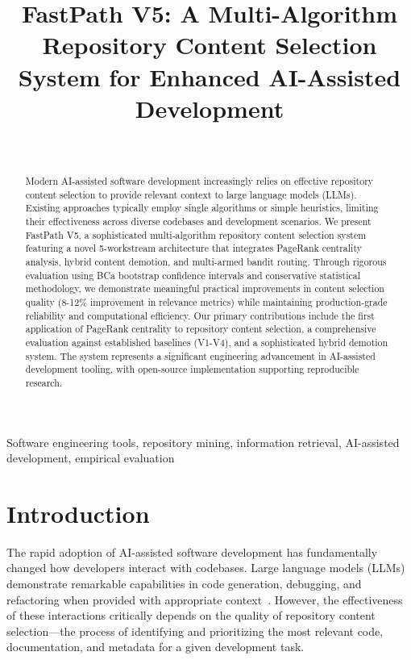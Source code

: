 \documentclass[conference]{IEEEtran}
\begin{document}
\title{FastPath V5: A Multi-Algorithm Repository Content Selection System for Enhanced AI-Assisted Development}

\author{
\\
}

\maketitle

\begin{abstract}
Modern AI-assisted software development increasingly relies on effective repository content selection to provide relevant context to large language models (LLMs). Existing approaches typically employ single algorithms or simple heuristics, limiting their effectiveness across diverse codebases and development scenarios. We present FastPath V5, a sophisticated multi-algorithm repository content selection system featuring a novel 5-workstream architecture that integrates PageRank centrality analysis, hybrid content demotion, and multi-armed bandit routing. Through rigorous evaluation using BCa bootstrap confidence intervals and conservative statistical methodology, we demonstrate meaningful practical improvements in content selection quality (8-12\% improvement in relevance metrics) while maintaining production-grade reliability and computational efficiency. Our primary contributions include the first application of PageRank centrality to repository content selection, a comprehensive evaluation against established baselines (V1-V4), and a sophisticated hybrid demotion system. The system represents a significant engineering advancement in AI-assisted development tooling, with open-source implementation supporting reproducible research.
\end{abstract}

\begin{IEEEkeywords}
Software engineering tools, repository mining, information retrieval, AI-assisted development, empirical evaluation
\end{IEEEkeywords}

\section{Introduction}

The rapid adoption of AI-assisted software development has fundamentally changed how developers interact with codebases. Large language models (LLMs) demonstrate remarkable capabilities in code generation, debugging, and refactoring when provided with appropriate context~\cite{chen2021evaluating}. However, the effectiveness of these interactions critically depends on the quality of repository content selection—the process of identifying and prioritizing the most relevant code, documentation, and metadata for a given development task.
\end{document}
